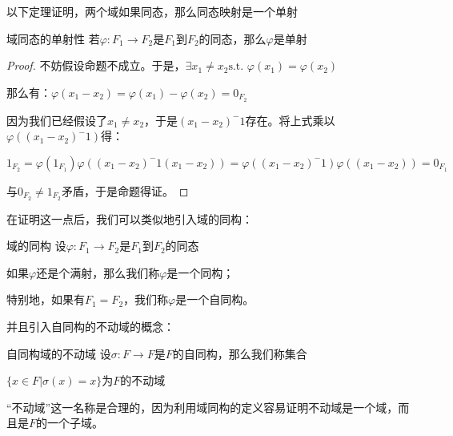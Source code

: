 \documentclass[12pt, a4paper, oneside, UTF8]{ctexbook}
\begin{document}
		以下定理证明，两个域如果同态，那么同态映射是一个单射
		\begin{them}{域同态的单射性}{}
			若$\varphi : F_1 \rightarrow F_2$是$F_1$到$F_2$的同态，那么$\varphi$是单射
		\end{them}
		\begin{proof}
			不妨假设命题不成立。于是，$\exists x_1 \neq x_2 \text{s.t. }\varphi(x_1)=\varphi(x_2)$
			
			那么有：$\varphi (x_1-x_2)=\varphi (x_1)-\varphi (x_2) = 0_{F_2}$
			
			因为我们已经假设了$x_1 \neq x_2$，于是$(x_1-x_2)^-1$存在。将上式乘以$\varphi\left((x_1-x_2)^-1\right)$得：
			
			$1_{F_2} = \varphi (1_{F_1}) \varphi\left((x_1-x_2)^-1 (x_1-x_2)\right) = \varphi\left((x_1-x_2)^-1\right)\varphi\left((x_1-x_2)\right)=0_{F_1}$
			
			与$0_{F_2} \neq 1_{F_2}$矛盾，于是命题得证。
		\end{proof}
		在证明这一点后，我们可以类似地引入域的同构：
		\begin{defn}{域的同构}{}
			设$\varphi : F_1 \rightarrow F_2$是$F_1$到$F_2$的同态
			
			如果$\varphi$还是个满射，那么我们称$\varphi$是一个同构；
			
			特别地，如果有$F_1=F_2$，我们称$\varphi$是一个自同构。
		\end{defn}
		并且引入自同构的不动域的概念：
		\begin{defn}{自同构域的不动域}{}
			设$\sigma : F \rightarrow F$是$F$的自同构，那么我们称集合
			
			$\{x \in F | \sigma(x) = x\}$为$F$的不动域
		\end{defn}
		“不动域”这一名称是合理的，因为利用域同构的定义容易证明不动域是一个域，而且是$F$的一个子域。
\end{document}
